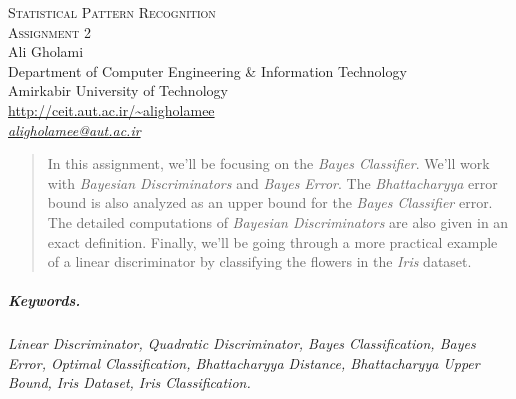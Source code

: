\documentclass[12pt]{article}
\numberwithin{equation}{section}
\numberwithin{table}{section}
\numberwithin{figure}{section}
\begin{document}

\begin{center}
\textsc{\Large Statistical Pattern Recognition} \\[2pt]
	\textsc{\large Assignment 2}\\
	\vspace{0.5cm}
  Ali Gholami \\[6pt]
  Department of Computer Engineering \& Information Technology\\
  Amirkabir University of Technology  \\[6pt]
  \def\UrlFont{\em}
  \url{http://ceit.aut.ac.ir/~aligholamee}\\
    \href{mailto:aligholamee@aut.ac.ir}{\textit{aligholamee@aut.ac.ir}}
\end{center}

\begin{abstract}
In this assignment, we'll be focusing on the \textit{Bayes Classifier}. We'll work with \textit{Bayesian Discriminators} and \textit{Bayes Error}. The \textit{Bhattacharyya} error bound is also analyzed as an upper bound for the \textit{Bayes Classifier} error. The detailed computations of \textit{Bayesian Discriminators} are also given in an exact definition. Finally, we'll be going through a more practical example of a linear discriminator by classifying the flowers in the \textit{Iris} dataset.
\end{abstract}

\subparagraph{Keywords.} \textit{Linear Discriminator, Quadratic Discriminator, Bayes Classification, Bayes Error, Optimal Classification, Bhattacharyya Distance, Bhattacharyya Upper Bound, Iris Dataset, Iris Classification.}
\end{document}
